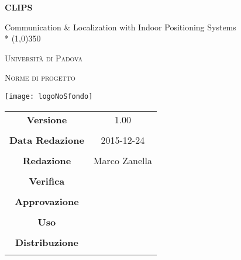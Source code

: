\documentclass[a4paper]{article}
\begin{document}
	\begin{titlepage}
		\centering
		{\huge\bfseries CLIPS\par}
		Communication \& Localization with Indoor Positioning Systems \\*
		\line(1,0){350} \\
		{\scshape\LARGE Universit\`a{} di Padova \par}
		\vspace{1cm}
		{\scshape\Large Norme di progetto\par}
		\vspace{2cm}
		\begin{center}
		{\texttt{[image: logoNoSfondo]} \par}
		\end{center}
		\vfill \vfill
		\begin{tabular}{c|c}
			{\hfill \textbf{Versione}} 			& 1.00			\\ \\
			{\hfill\textbf{Data Redazione}} 		& 2015-12-24  		\\ \\
			{\hfill\textbf{Redazione}} 			&  Marco Zanella      \\ \\
			{\hfill\textbf{Verifica}} 				&  \\ \\
			{\hfill\textbf{Approvazione}} 		&  \\ \\
			{\hfill\textbf{Uso}} 					& \\ \\
			{\hfill\textbf{Distribuzione}} 			& \\ \\
		\end{tabular}
	\end{titlepage}
\pagestyle{mymain}

\glsaddall
\printglossary[style=indexgroup, nonumberlist]
\label{LastPage}
\end{document}
